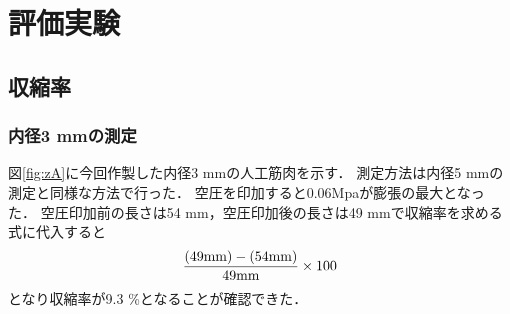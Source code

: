 \newpage
\section{評価実験}
\subsection{収縮率}
\subsubsection{内径3 mmの測定}
図\ref{fig:zA}に今回作製した内径3 mmの人工筋肉を示す．
測定方法は内径5 mmの測定と同様な方法で行った．
空圧を印加すると0.06Mpaが膨張の最大となった．
空圧印加前の長さは54 mm，空圧印加後の長さは49 mmで収縮率を求める式に代入すると
$$\frac{(49 \rm{mm})-(54 \rm{mm})}{49 \rm{mm}}\times 100\\$$
となり収縮率が9.3 \%となることが確認できた．
